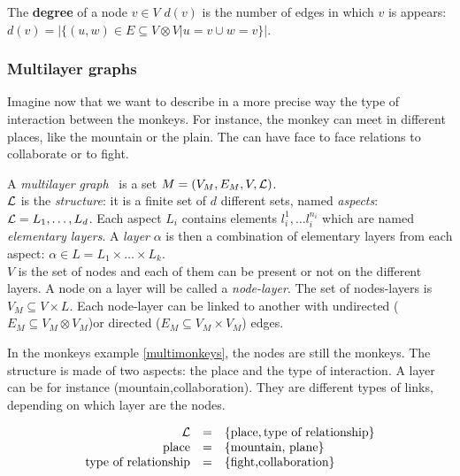 \documentclass{svproc}
\begin{document}
The {\bf degree} of a node $v\in V$ $d(v)$ is the number of edges in which $v$ is appears: $d(v)=|\{(u,w) \in E \subseteq V \otimes V| u=v \cup w=v\}|$.

\subsubsection{Multilayer graphs}
%
Imagine now that we want to describe in a more precise way the type of interaction between the monkeys. For instance, the monkey can meet in different places, like the mountain or the plain. The can have face to face relations to collaborate or to fight.

A {\em multilayer graph}~\cite{mlkiv,mldd} is a set $M=(V_M,E_M,V,{\cal L})$.\\
${\cal L}$ is the {\em structure}: it is a finite set of $d$ different sets, named {\em aspects}: ${\cal L} = L_1, \dots, L_d$. Each aspect $L_i$ contains elements $l_i^1,\dots l_i^{n_i}$ which are named {\em elementary layers}. A {\em layer} $\alpha$ is then a combination of elementary layers from each aspect: $\alpha \in L=L_1\times \dots \times L_k$. \\
$V$ is the set of nodes and each of them can be present or not on the different layers. A node on a layer will be called a {\em node-layer}. The set of nodes-layers is $V_M \subseteq V \times L$. Each node-layer can be linked to another with undirected ($E_M\subseteq V_M \otimes V_M$)or directed ($E_M \subseteq V_M \times V_M$) edges.

In the monkeys example \cref{multimonkeys}, the nodes are still the monkeys. The structure is made of two aspects: the place and the type of interaction. A layer can be for instance (mountain,collaboration). They are different types of links, depending on which layer are the nodes.

\begin{equation}
\begin{array}{rcl}
  {\cal L}&=&\{\text{place},\text{type of relationship}\} \\
  \text{place} &=& \{\text{mountain, plane}\}\\
 \text{type of relationship} &=& \{ \text{fight,collaboration}\}
\end{array}
\end{equation}
\end{document}
